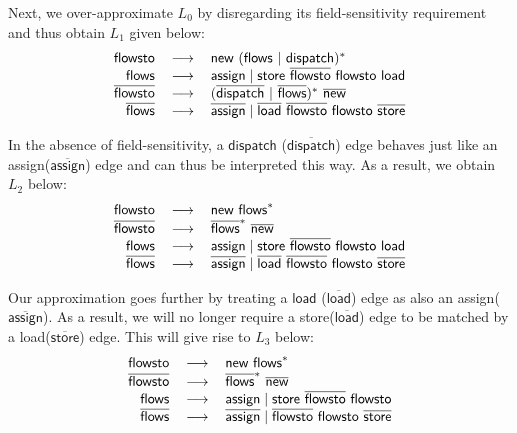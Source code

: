 \documentclass[sigplan,10pt,review,anonymous]{acmart}
\newcommand{\reg}[1]{\textsf{#1}\xspace}
\newcommand{\invreg}[1]{\overline{\reg{#1}}\xspace}
\newcommand{\flowsto}{\reg{flowsto}}
\newcommand{\iflowsto}{\invreg{flowsto}}
\newcommand{\flows}{\reg{flows}}
\newcommand{\iflows}{\invreg{flows}}
\newcommand{\new}{\reg{new}}
\newcommand{\inew}{\invreg{new}}
\newcommand{\assign}{\reg{assign}}
\newcommand{\iassign}{\invreg{assign}}
\newcommand{\store}{\reg{store}}
\newcommand{\istore}{\invreg{store}}
\newcommand{\load}{\reg{load}}
\newcommand{\iload}{\invreg{load}}
\newcommand{\indispatch}{\reg{dispatch}}
\newcommand{\iindispatch}{\invreg{dispatch}}
\begin{document}
Next, we over-approximate $L_0$ by disregarding its field-sensitivity requirement 
and thus obtain 
$L_1$ given  below:
\begin{equation}
\label{eqn:newL1}
\begin{tabular}{rcl}
$\flowsto$ & $\longrightarrow$ & $\new~(\flows~|~\indispatch)^*$ \\
$\flows$ & $\longrightarrow$ & $\assign \mid \store \ \iflowsto ~ \flowsto \ \load$ \\
$\iflowsto$ & $\longrightarrow$ & $(\iindispatch~|~\iflows)^*~\inew$ \\
$\iflows$ & $\longrightarrow$ & $\iassign \mid \iload \ \iflowsto ~ \flowsto \ \istore$  \\
\end{tabular}
\end{equation}

In the absence of field-sensitivity,  a $\indispatch$ ($\iindispatch$) edge behaves just
like an  \assign ($\iassign$) edge and can thus be interpreted this way. As a result, we 
obtain $L_2$ below:
\begin{equation}
\label{eqn:newL2}
\begin{tabular}{rcl} 
$\flowsto$ &  $\longrightarrow$ & $\new ~ \flows^*$ \\
$\iflowsto$ & $\longrightarrow$ & $\iflows^* ~ \inew$ \\
$\flows$  & $\longrightarrow$ & $\assign \mid  \store \ \iflowsto\ \flowsto \ \load$ \\
$\iflows$ & $\longrightarrow$ & $\iassign \mid \iload \ \iflowsto\ \flowsto \ \istore$\\
\end{tabular}
\end{equation}

Our approximation goes further by treating a $\load$ ($\iload$) edge as also an \assign ($\iassign$). As a result, we will no longer require a \store ($\iload$) edge
to be matched by
a \load ($\istore$) edge. This will give rise to $L_3$ below:
\begin{equation}
\label{eqn:newL3}
\begin{tabular}{rcl} 
$\flowsto$ & $\longrightarrow$ &  $\new ~ \flows^*$ \\
$\iflowsto$ &  $\longrightarrow$ & $\iflows^* ~ \inew$ \\
$\flows$ &  $\longrightarrow$ & $\assign \mid  \store \ \iflowsto\ \flowsto$\\
$\iflows$ &  $\longrightarrow$ & $\iassign \mid \iflowsto\ \flowsto \ \istore$
\end{tabular}
\end{equation}
\end{document}
